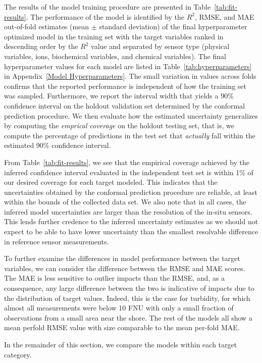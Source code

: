 \documentclass[remotesensing,article,submit,pdftex,moreauthors]{Definitions/mdpi}
\begin{document}
The results of the model training procedure are presented in Table~\ref{tab:fit-results}. The performance of the model is identified by the $R^2$, RMSE, and MAE out-of-fold estimates (mean $\pm$ standard deviation) of the final hyperparameter optimized model in the training set with the target variables ranked in descending order by the $R^2$ value and separated by sensor type (physical variables, ions, biochemical variables, and chemical variables). The final hyperparameter values for each model are listed in Table~\ref{tab:hyperparameters} in Appendix~\ref{Model Hyperparameters}. The small variation in values across folds confirms that the reported performance is independent of how the training set was sampled. Furthermore, we report the interval width that yields a 90\% confidence interval on the holdout validation set determined by the conformal prediction procedure. We then evaluate how the estimated uncertainty generalizes by computing the \textit{emprical coverage} on the holdout testing set, that is, we compute the percentage of predictions in the test set that \textit{actually} fall within the estimated 90\% confidence interval. 

From Table~\ref{tab:fit-results},  we see that the empirical coverage achieved by the inferred confidence interval evaluated in the independent test set is within 1\% of our desired coverage for each target modeled. This indicates that the uncertainties obtained by the conformal prediction procedure are reliable, at least within the bounds of the collected data set. We also note that in all cases, the inferred model uncertainties are larger than the resolution of the in-situ sensors. This lends further credence to the inferred uncertainty estimates as we should not expect to be able to have lower uncertainty than the smallest resolvable difference in reference sensor measurements.

To further examine the differences in model performance between the target variables, we can consider the difference between the RMSE and MAE scores. The MAE is less sensitive to outlier impacts than the RMSE, and, as a consequence, any large difference between the two is indicative of impacts due to the distribution of target values. Indeed, this is the case for turbidity, for which almost all measurements were below 10 FNU with only a small fraction of observations from a small area near the shore. The rest of the models all show a mean perfold RMSE value with size comparable to the mean per-fold MAE. 

In the remainder of this section, we compare the models within each target category.
\end{document}
